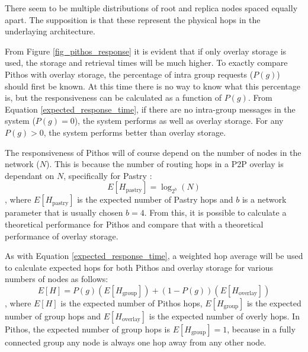 \documentclass[10pt,a4paper,conference]{IEEEtran}
\begin{document}
There seem to be multiple distributions of root and replica nodes spaced equally apart. The supposition is that these represent the physical hops in
the underlaying architecture.

From Figure \ref{fig_pithos_response} it is evident that if only overlay storage is used, the storage and retrieval times will be much higher. To
exactly compare Pithos with overlay storage, the percentage of intra group requests ($P(g)$) should first be known. At this time there is no way to
know what this percentage is, but the responsiveness can be calculated as a function of $P(g)$. From Equation \eqref{expected_response_time}, if
there are no intra-group messages in the system ($P(g) = 0$), the system performs as well as overlay storage. For any $P(g) > 0$, the system performs
better than overlay storage.

The responsiveness of Pithos will of course depend on the number of nodes in the network ($N$). This is because the number of routing hops in a P2P
overlay is dependant on $N$, specifically for Pastry \cite{storage_and_chaching_PAST}:
%
\begin{equation}\label{pastry_hops}
    E[H_{\textrm{pastry}}] = \log_{2^b}\left(N\right)
\end{equation}
%
, where $E[H_{\textrm{pastry}}]$ is the expected number of Pastry hops and $b$ is a network parameter that is usually chosen $b = 4$. From this, it
is possible to calculate a theoretical performance for Pithos and compare that with a theoretical performance of overlay storage.

As with Equation \eqref{expected_response_time}, a weighted hop average will be used to calculate expected hops for both Pithos and overlay storage
for various numbers of nodes as follows:
%
\begin{equation}\label{expected_response_time}
    E[H] = P(g)\left(E\left[H_{\textrm{group}}\right]\right) + \left(1 - P(g)\right)\left(E\left[H_{\textrm{overlay}}\right]\right)
\end{equation}
%
, where $E[H]$ is the expected number of Pithos hops, $E\left[H_{\textrm{group}}\right]$ is the expected number of group hops and
$E\left[H_{\textrm{overlay}}\right]$ is the expected number of overly hops. In Pithos, the expected number of group hops is
$E\left[H_{\textrm{group}}\right] = 1$, because in a fully connected group any node is always one hop away from any other node.
\end{document}
